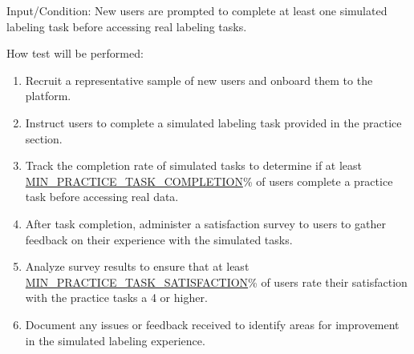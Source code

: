\documentclass[12pt, titlepage]{article}
\begin{document}
\begin{enumerate}
Input/Condition: New users are prompted to complete at least one simulated labeling task before accessing real labeling tasks.

How test will be performed:
\begin{enumerate}
    \item Recruit a representative sample of new users and onboard them to the platform.
    \item Instruct users to complete a simulated labeling task provided in the practice section.
    \item Track the completion rate of simulated tasks to determine if at least \hyperref[MIN_PRACTICE_TASK_COMPLETION]{MIN\_PRACTICE\_TASK\_COMPLETION}\% of users complete a practice task before accessing real data.
    \item After task completion, administer a satisfaction survey to users to gather feedback on their experience with the simulated tasks.
    \item Analyze survey results to ensure that at least \hyperref[MIN_PRACTICE_TASK_SATISFACTION]{MIN\_PRACTICE\_TASK\_SATISFACTION}\% of users rate their satisfaction with the practice tasks a 4 or higher.
    \item Document any issues or feedback received to identify areas for improvement in the simulated labeling experience.
\end{enumerate}


\end{enumerate}

\end{document}
